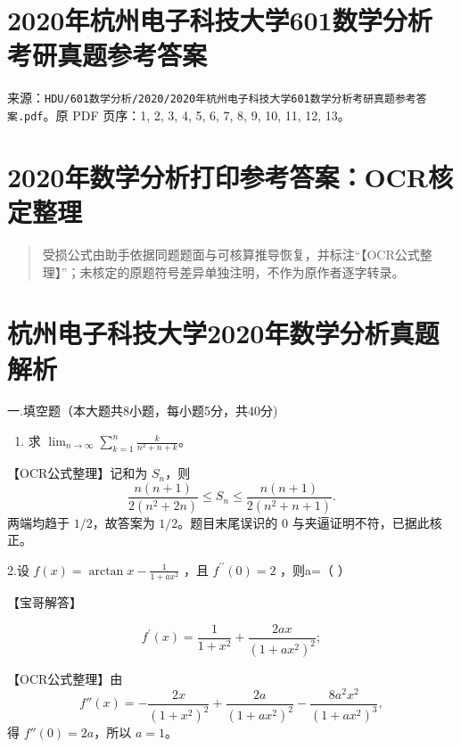 \documentclass[11pt,fontset=fandol]{ctexart}
\providecommand{\tightlist}{\setlength{\itemsep}{0pt}\setlength{\parskip}{0pt}}
\begin{document}
\section{2020年杭州电子科技大学601数学分析考研真题参考答案}\label{ux5e74ux676dux5ddeux7535ux5b50ux79d1ux6280ux5927ux5b66601ux6570ux5b66ux5206ux6790ux8003ux7814ux771fux9898ux53c2ux8003ux7b54ux6848}

来源：\texttt{HDU/601数学分析/2020/2020年杭州电子科技大学601数学分析考研真题参考答案.pdf}。原
PDF 页序：1, 2, 3, 4, 5, 6, 7, 8, 9, 10, 11, 12, 13。

\section{2020年数学分析打印参考答案：OCR核定整理}\label{ux5e74ux6570ux5b66ux5206ux6790ux6253ux5370ux53c2ux8003ux7b54ux6848ocrux6838ux5b9aux6574ux7406}

\begin{quote}
受损公式由助手依据同题题面与可核算推导恢复，并标注``【OCR公式整理】''；未核定的原题符号差异单独注明，不作为原作者逐字转录。
\end{quote}

\section{杭州电子科技大学2020年数学分析真题解析}\label{ux676dux5ddeux7535ux5b50ux79d1ux6280ux5927ux5b662020ux5e74ux6570ux5b66ux5206ux6790ux771fux9898ux89e3ux6790}

一.填空题（本大题共8小题，每小题5分，共40分)

\begin{enumerate}
\def\labelenumi{\arabic{enumi}.}
\tightlist
\item
  求 \(\lim_{n\to\infty}\sum_{k=1}^n\frac{k}{n^2+n+k}\)。
\end{enumerate}

【OCR公式整理】记和为 \(S_n\)，则 \[
\frac{n(n+1)}{2(n^2+2n)}
\le S_n\le\frac{n(n+1)}{2(n^2+n+1)}.
\] 两端均趋于 \(1/2\)，故答案为 \(1/2\)。题目末尾误识的 \(0\)
与夹逼证明不符，已据此核正。

2.设 \(f ( x ) = \arctan x - { \frac { 1 } { 1 + a x ^ { 2 } } }\) ，且
\(f ^ { \prime \prime } ( 0 ) = 2\) ，则a=（ ）

【宝哥解答】

\[
f ^ { \prime } ( x ) = \frac { 1 } { 1 + x ^ { 2 } } + \frac { 2 a x } { ( 1 + a x ^ { 2 } ) ^ { 2 } } ;
\]

【OCR公式整理】由 \[
f''(x)=-\frac{2x}{(1+x^2)^2}
+\frac{2a}{(1+ax^2)^2}
-\frac{8a^2x^2}{(1+ax^2)^3},
\] 得 \(f''(0)=2a\)，所以 \(a=1\)。
\end{document}

